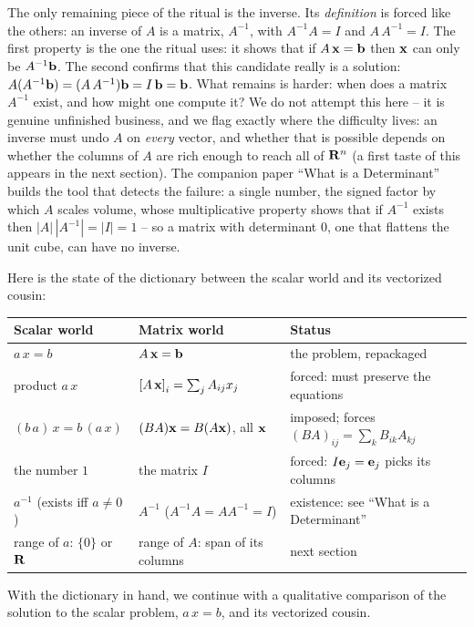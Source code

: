 \documentclass{article}
\begin{document}
The only remaining piece of the ritual is the inverse. Its {\em definition\/}
is forced like the others: an inverse of $A$ is a matrix, $A^{-1}$, with
$A^{-1} A = I$ and $A \, A^{-1} = I$. The first property is the one the ritual
uses: it shows that if $A \, {\bf x} = {\bf b}$ then ${\bf x}$ can only be
$A^{-1} {\bf b}$. The second confirms that this candidate really is a
solution: $A (A^{-1} {\bf b}) = (A \, A^{-1}) {\bf b} = I \, {\bf b} = {\bf b}$.
What remains is harder: when does a matrix
$A^{-1}$ exist, and how might one compute it? We do not attempt this here --
it is genuine unfinished business, and we flag exactly where the difficulty
lives: an inverse must undo $A$ on {\em every\/} vector, and whether that is
possible depends on whether the columns of $A$ are rich enough to reach all of
${\bf R}^n$ (a first taste of this appears in the next section). The companion
paper ``What is a Determinant'' builds the tool that detects the failure: a
single number, the signed factor by which $A$ scales volume, whose
multiplicative property shows that if $A^{-1}$ exists then
$|A| \, |A^{-1}| = |I| = 1$ -- so a matrix with determinant $0$, one that
flattens the unit cube, can have no inverse.

Here is the state of the dictionary between the scalar world and its
vectorized cousin:
\begin{center}
\begin{tabular}{l|l|l}
{\bf Scalar world} & {\bf Matrix world} & {\bf Status} \\
\hline
$a \, x = b$ & $A \, {\bf x} = {\bf b}$ & the problem, repackaged \\
product $a \, x$ & $\left[A \, {\bf x}\right]_i = \sum_{j} A_{ij} x_j$ & forced: must preserve the equations \\
$(b \, a) \, x = b \, (a \, x)$ & $(B A) {\bf x} = B (A {\bf x})$, all ${\bf x}$ & imposed; forces $(BA)_{ij} = \sum_{k} B_{ik} A_{kj}$ \\
the number $1$ & the matrix $I$ & forced: $I {\bf e}_j = {\bf e}_j$ picks its columns \\
$a^{-1}$ (exists iff $a \neq 0$) & $A^{-1}$ ($A^{-1}A = AA^{-1} = I$) & existence: see ``What is a Determinant'' \\
range of $a$: $\{0\}$ or ${\bf R}$ & range of $A$: span of its columns & next section \\
\end{tabular}
\end{center}

With the dictionary in hand, we continue with
a qualitative comparison of the solution to the scalar problem, $a\, x = b$,
and its vectorized cousin.
\end{document}
